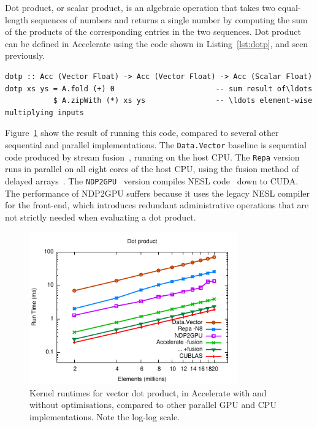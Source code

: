 Dot product, or scalar product, is an algebraic operation that takes two
equal-length sequences of numbers and returns a single number by computing the
sum of the products of the corresponding entries in the two sequences. Dot
product can be defined in Accelerate using the code shown in
Listing~\ref{lst:dotp}, and seen previously.

\begin{lstlisting}[style=haskell_float
    ,label=lst:dotp
    ,caption={Vector dot-product in Accelerate}]
dotp :: Acc (Vector Float) -> Acc (Vector Float) -> Acc (Scalar Float)
dotp xs ys = A.fold (+) 0                       -- sum result of\ldots
           $ A.zipWith (*) xs ys                -- \ldots element-wise multiplying inputs
\end{lstlisting}

Figure~\ref{fig:dotp} show the result of running this code, compared to several
other sequential and parallel implementations. The \texttt{Data.Vector} baseline
is sequential code produced by stream
fusion~\cite{Coutts:2007kp}, running on the host CPU. The \texttt{Repa} version
runs in parallel on all eight cores of the host CPU, using the fusion method of
delayed arrays~\cite{Keller:2010er}. The
\texttt{NDP2GPU}~\cite{Bergstrom:2012bi} version compiles NESL
code~\cite{Blelloch:1995ut} down to CUDA. The performance of NDP2GPU suffers
because it uses the legacy NESL compiler for the front-end, which introduces
redundant administrative operations that are not strictly needed when evaluating
a dot product.

\begin{figure}
    \begin{center}
        \includegraphics[width=0.8\textwidth]{images/sec-6/dotp/dotp}
    \end{center}
    \caption[Vector dot product kernel benchmarks]{Kernel runtimes for vector
        dot product, in Accelerate with and without optimisations, compared to
        other parallel GPU and CPU implementations. Note the log-log scale.}
    \label{fig:dotp}
\end{figure}

